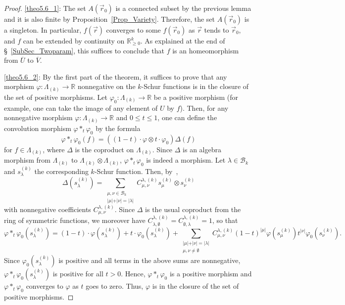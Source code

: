 \documentclass[10pt,a4paper]{amsart}
\theoremstyle{definition}
\begin{document}
\begin{proof}
\eqref{theo5.6_1}: The set $A(\vec{r}_{0})$ is a connected subset by the previous lemma and
it is also finite by Proposition~\ref{Prop_Variety}. Therefore, the set
$A(\vec{r}_{0})$ is a singleton. In particular, $f(\vec{r})$ converges to some
$f(\vec{r}_{0})$ as $\vec{r}$ tends to $\vec{r}_{0}$, and $f$ can be extended
by continuity on $\mathbb{R}_{\geq0}^{k}$. As explained at the end of
\S~\ref{SubSec_Twoparam}, this suffices to conclude that $f$ is an
homeomorphism from $\overline{U}$ to $\overline{V}$.

\eqref{theo5.6_2}: By the first part of the theorem, it suffices to prove that any morphism
$\varphi:\Lambda_{(k)}\rightarrow\mathbb{R}$ nonnegative on the $k$-Schur
functions is in the closure of the set of positive morphisms. Let $\varphi
_{0}:\Lambda_{(k)}\rightarrow\mathbb{R}$ be a positive morphism (for example,
one can take the image of any element of $U$ by $f$). Then, for any
nonnegative morphism $\varphi:\Lambda_{(k)}\rightarrow\mathbb{R}$ and $0\leq
t\leq1$, one can define the convolution morphism $\varphi*_{t}\varphi_{0}$ by
the formula
\[
\varphi*_{t}\varphi_{0}(f)=((1-t)\cdot\varphi\otimes t\cdot\varphi_{0}%
)\Delta(f)
\]
for $f\in\Lambda_{(k)}$, where $\Delta$ is the coproduct on $\Lambda_{(k)}$.
Since $\Delta$ is an algebra morphism from $\Lambda_{(k)}$ to $\Lambda
_{(k)}\otimes\Lambda_{(k)}$, $\varphi*_{t}\varphi_{0}$ is indeed a morphism.
Let $\lambda\in\mathcal{B}_{k}$ and $s_{\lambda}^{(k)}$ the corresponding
$k$-Schur function. Then, by~\cite[Corollary~8.1]{LamLR},
\[
\Delta(s_{\lambda}^{(k)})=\sum_{\substack{\mu,\nu\in\mathcal{B}_{k}\\\vert
\mu\vert+\vert\nu\vert=\vert\lambda\vert}}C_{\mu,\nu}^{\lambda,(k)}s_{\mu
}^{(k)}\otimes s_{\nu}^{(k)}%
\]
with nonnegative coefficients $C_{\mu,\nu}^{\lambda,(k)}$. Since $\Delta$ is
the usual coproduct from the ring of symmetric functions, we moreover have
$C_{\lambda,\emptyset}^{\lambda,(k)}=C_{\emptyset,\lambda}^{\lambda,(k)}=1$,
so that
\[
\varphi*_{t}\varphi_{0}(s_{\lambda}^{(k)})=(1-t)\cdot\varphi(s_{\lambda}%
^{(k)})+t\cdot\varphi_{0}(s_{\lambda}^{(k)})+\sum_{\substack{\vert\mu
\vert+\vert\nu\vert=\vert\lambda\vert\\\mu,\nu\not =\emptyset}}C_{\mu,\nu
}^{\lambda,(k)}(1-t)^{\vert\mu\vert}\varphi(s_{\mu}^{(k)})t^{\vert\nu\vert}
\varphi_{0}(s_{\nu}^{(k)}).
\]
Since $\varphi_{0}(s_{\lambda}^{(k)})$ is positive and all terms in the above
sums are nonnegative, $\varphi*_{t}\varphi_{0}(s_{\lambda}^{(k)})$ is positive
for all $t>0$. Hence, $\varphi*_{t}\varphi_{0}$ is a positive morphism and
$\varphi*_{t}\varphi_{0}$ converges to $\varphi$ as $t$ goes to zero. Thus,
$\varphi$ is in the closure of the set of positive morphisms.
\end{proof}
\end{document}
